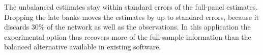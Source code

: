 \begin{table}[t!]
\centering\scriptsize

\caption{Bank data with artificial staggered entry: 2SIV estimates.}
\label{tab:bank_staggered}
\end{table}

The unbalanced estimates stay within \BankMaxStagDiffSE{} standard errors
of the full-panel estimates. Dropping the late banks moves the estimates by
up to \BankMaxDropDiffSE{} standard errors, because it discards 30\% of the
network as well as the observations. In this application the experimental
option thus recovers more of the full-sample information than the balanced
alternative available in existing software.
